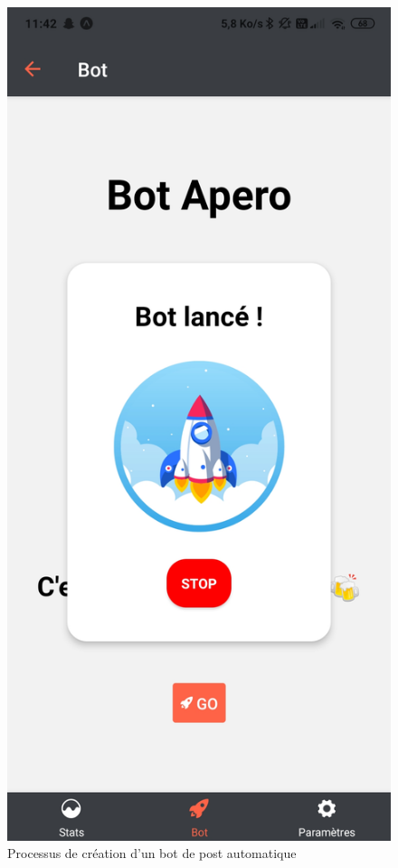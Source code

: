 \documentclass{article}
\begin{document}
\begin{figure}[h!]
\includegraphics[scale=0.1]{images/lancement_bot.jpg}
\caption{Processus de création d'un bot de post automatique}
\label{fig:Processus de création d'un bot de post automatique}
\end{figure}
\end{document}
